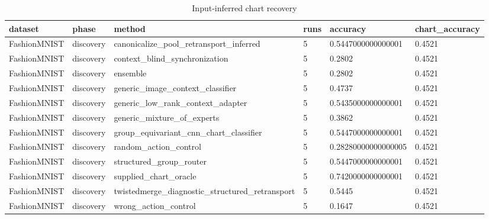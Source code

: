 \begin{table}[t]
\centering
\caption{Input-inferred chart recovery}
\begin{tabular}{llllll}
\toprule
dataset & phase & method & runs & accuracy & chart\_accuracy \\
\midrule
FashionMNIST & discovery & canonicalize\_pool\_retransport\_inferred & 5 & 0.5447000000000001 & 0.4521 \\
FashionMNIST & discovery & context\_blind\_synchronization & 5 & 0.2802 & 0.4521 \\
FashionMNIST & discovery & ensemble & 5 & 0.2802 & 0.4521 \\
FashionMNIST & discovery & generic\_image\_context\_classifier & 5 & 0.4737 & 0.4521 \\
FashionMNIST & discovery & generic\_low\_rank\_context\_adapter & 5 & 0.5435000000000001 & 0.4521 \\
FashionMNIST & discovery & generic\_mixture\_of\_experts & 5 & 0.3862 & 0.4521 \\
FashionMNIST & discovery & group\_equivariant\_cnn\_chart\_classifier & 5 & 0.5447000000000001 & 0.4521 \\
FashionMNIST & discovery & random\_action\_control & 5 & 0.28280000000000005 & 0.4521 \\
FashionMNIST & discovery & structured\_group\_router & 5 & 0.5447000000000001 & 0.4521 \\
FashionMNIST & discovery & supplied\_chart\_oracle & 5 & 0.7420000000000001 & 0.4521 \\
FashionMNIST & discovery & twistedmerge\_diagnostic\_structured\_retransport & 5 & 0.5445 & 0.4521 \\
FashionMNIST & discovery & wrong\_action\_control & 5 & 0.1647 & 0.4521 \\
\bottomrule
\end{tabular}
\end{table}
